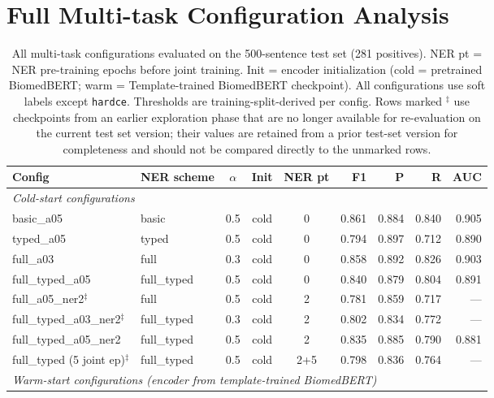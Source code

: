 \documentclass[11pt]{article}
\begin{document}
\section{Full Multi-task Configuration Analysis}
\label{app:fullablation}

\begin{table}[H]
\centering
\small
\caption{All multi-task configurations evaluated on the 500-sentence test set
(281 positives). NER pt = NER pre-training epochs before joint training.
Init = encoder initialization (cold = pretrained BiomedBERT; warm = Template-trained BiomedBERT checkpoint).
All configurations use soft labels except \texttt{hardce}.
Thresholds are training-split-derived per config. Rows marked $^{\ddagger}$ use
checkpoints from an earlier exploration phase that are no longer available
for re-evaluation on the current test set version; their values are
retained from a prior test-set version for completeness and should not be
compared directly to the unmarked rows.}
\label{tab:ablation_full}
\begin{tabular}{llcccrrrr}
\toprule
\textbf{Config} & \textbf{NER scheme} & $\alpha$ & \textbf{Init} & \textbf{NER pt} &
\textbf{F1} & \textbf{P} & \textbf{R} & \textbf{AUC} \\
\midrule
\multicolumn{9}{l}{\textit{Cold-start configurations}} \\
\midrule
basic\_a05                          & basic       & 0.5 & cold & 0 & 0.861 & 0.884 & 0.840 & 0.905 \\
typed\_a05                          & typed       & 0.5 & cold & 0 & 0.794 & 0.897 & 0.712 & 0.890 \\
full\_a03                           & full        & 0.3 & cold & 0 & 0.858 & 0.892 & 0.826 & 0.903 \\
full\_typed\_a05                    & full\_typed & 0.5 & cold & 0 & 0.840 & 0.879 & 0.804 & 0.891 \\
full\_a05\_ner2$^{\ddagger}$        & full        & 0.5 & cold & 2 & 0.781 & 0.859 & 0.717 & --- \\
full\_typed\_a03\_ner2$^{\ddagger}$ & full\_typed & 0.3 & cold & 2 & 0.802 & 0.834 & 0.772 & --- \\
full\_typed\_a05\_ner2 & full\_typed & 0.5 & cold & 2 & 0.835 & 0.885 & 0.790 & 0.881 \\
full\_typed (5 joint ep)$^{\ddagger}$ & full\_typed & 0.5 & cold & 2+5 & 0.798 & 0.836 & 0.764 & --- \\
\midrule
\multicolumn{9}{l}{\textit{Warm-start configurations (encoder from template-trained BiomedBERT)}} \\

\end{tabular}
\end{table}
\end{document}
